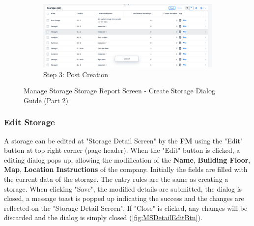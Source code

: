 \begin{figure}[H]
    \ContinuedFloat
    \centering
    
    \begin{subfigure}{0.95\linewidth}
        \includegraphics[width=\linewidth]{images/user_doc/storage/StorageReportPage/createdToast.png}
        \caption{Step 3: Post Creation}
    \end{subfigure}
    
    \caption{Manage Storage Storage Report Screen - Create Storage Dialog Guide (Part 2)}
    \label{fig:MSreportCreateGuide2}
\end{figure}

\subsubsection{Edit Storage}

A storage can be edited at "Storage Detail Screen" by the \textbf{FM} using the "Edit" button at top right corner (page header). 
When the "Edit" button is clicked, a editing dialog pops up, allowing the modification of the \textbf{Name}, \textbf{Building Floor}, \textbf{Map}, \textbf{Location Instructions} of the company. Initially the fields are filled with the current data of the storage. The entry rules are the same as creating a storage.
When clicking "Save", the modified details are submitted, the dialog is closed, a message toast is popped up indicating the success and the changes are reflected on the "Storage Detail Screen". If "Close" is clicked, any changes will be discarded and the dialog is simply closed (\autoref{fig:MSDetailEditBtn}).


